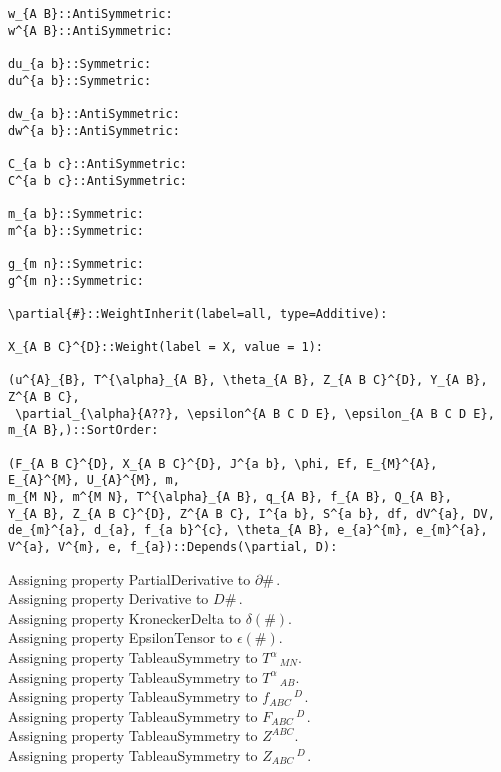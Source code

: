 \documentclass[11pt]{article}
\begin{document}
{\begin{verbatim}
w_{A B}::AntiSymmetric:
w^{A B}::AntiSymmetric:

du_{a b}::Symmetric:
du^{a b}::Symmetric:

dw_{a b}::AntiSymmetric:
dw^{a b}::AntiSymmetric:

C_{a b c}::AntiSymmetric:
C^{a b c}::AntiSymmetric:

m_{a b}::Symmetric:
m^{a b}::Symmetric:

g_{m n}::Symmetric:
g^{m n}::Symmetric:

\partial{#}::WeightInherit(label=all, type=Additive):

X_{A B C}^{D}::Weight(label = X, value = 1):

(u^{A}_{B}, T^{\alpha}_{A B}, \theta_{A B}, Z_{A B C}^{D}, Y_{A B}, Z^{A B C},
 \partial_{\alpha}{A??}, \epsilon^{A B C D E}, \epsilon_{A B C D E}, m_{A B},)::SortOrder:

(F_{A B C}^{D}, X_{A B C}^{D}, J^{a b}, \phi, Ef, E_{M}^{A}, E_{A}^{M}, U_{A}^{M}, m,
m_{M N}, m^{M N}, T^{\alpha}_{A B}, q_{A B}, f_{A B}, Q_{A B},
Y_{A B}, Z_{A B C}^{D}, Z^{A B C}, I^{a b}, S^{a b}, df, dV^{a}, DV,
de_{m}^{a}, d_{a}, f_{a b}^{c}, \theta_{A B}, e_{a}^{m}, e_{m}^{a}, V^{a}, V^{m}, e, f_{a})::Depends(\partial, D):
\end{verbatim}}
Assigning property PartialDerivative to $\partial{\#}\, $.
\\
Assigning property Derivative to $D{\#}\, $.
\\
Assigning property KroneckerDelta to $\delta(\#)$.
\\
Assigning property EpsilonTensor to $\epsilon(\#)$.
\\
Assigning property TableauSymmetry to ${T}^{\alpha}\,_{M N}$.
\\
Assigning property TableauSymmetry to ${T}^{\alpha}\,_{A B}$.
\\
Assigning property TableauSymmetry to ${f}_{A B C}\,^{D\, }$.
\\
Assigning property TableauSymmetry to ${F}_{A B C}\,^{D\, }$.
\\
Assigning property TableauSymmetry to ${Z}^{A B C}$.
\\
Assigning property TableauSymmetry to ${Z}_{A B C}\,^{D\, }$.
\end{document}
